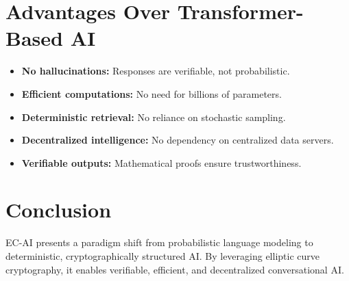 \documentclass{article}
\begin{document}
\section{Advantages Over Transformer-Based AI}

\begin{itemize}
    \item \textbf{No hallucinations:} Responses are verifiable, not probabilistic.
    \item \textbf{Efficient computations:} No need for billions of parameters.
    \item \textbf{Deterministic retrieval:} No reliance on stochastic sampling.
    \item \textbf{Decentralized intelligence:} No dependency on centralized data servers.
    \item \textbf{Verifiable outputs:} Mathematical proofs ensure trustworthiness.
\end{itemize}

\section{Conclusion}
EC-AI presents a paradigm shift from probabilistic language modeling to deterministic, cryptographically structured AI. By leveraging elliptic curve cryptography, it enables verifiable, efficient, and decentralized conversational AI.
\end{document}

